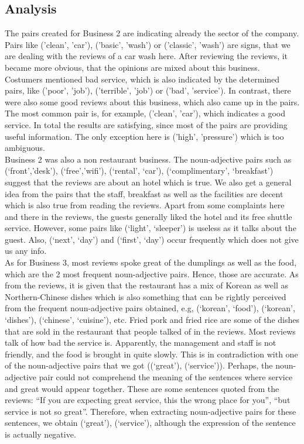 \subsection{Analysis}
The pairs created for Business 2 are indicating already the sector of the company. Pairs like ('clean', 'car'), ('basic', 'wash') or ('classic', 'wash') are signs, that we are dealing with the reviews of a car wash here. After reviewing the reviews, it became more obvious, that the opinions are mixed about this business. Costumers mentioned bad service, which is also indicated by the determined pairs, like ('poor', 'job'), ('terrible', 'job') or ('bad', 'service'). In contrast, there were also some good reviews about this business, which also came up in the pairs. The most common pair is, for example, ('clean', 'car'), which indicates a good service. In total the results are satisfying, since most of the pairs are providing useful information. The only exception here is ('high', 'pressure') which is too ambiguous.\\
Business 2 was also a non restaurant business. The noun-adjective pairs such as (‘front’,’desk’), (‘free’,’wifi’), (‘rental’, ‘car’), (‘complimentary’, ‘breakfast’) suggest that the reviews are about an hotel which is true. We also get a general idea from the pairs that the staff, breakfast as well as the facilities are decent which is also true from reading the reviews. Apart from some complaints here and there in the reviews, the guests generally liked the hotel and its free shuttle service. However, some pairs like (‘light’, ‘sleeper’) is useless as it talks about the guest. Also, (‘next’, ‘day’) and (‘first’, ‘day’) occur frequently which does not give us any info.\\
As for Business 3, most reviews spoke great of the dumplings as well as the food, which are the 2 most frequent noun-adjective pairs. Hence, those are accurate. As from the reviews, it is given that the restaurant has a mix of Korean as well as Northern-Chinese dishes which is also something that can be rightly perceived from the frequent noun-adjective pairs obtained, e.g, (‘korean’, ‘food’), (‘korean’, ‘dishes’), (‘chinese’, ‘cuisine’), etc. Fried pork and fried rice are some of the dishes that are sold in the restaurant that people talked of in the reviews. Most reviews talk of how bad the service is. Apparently, the management and staff is not friendly, and the food is brought in quite slowly. This is in contradiction with one of the noun-adjective pairs that we got ((‘great’), (‘service’)).  Perhaps, the noun-adjective pair could not comprehend the meaning of the sentences where service and great would appear together. These are some sentences quoted from the reviews: “If you are expecting great service, this the wrong place for you”, “but service is not so great”.  Therefore, when extracting noun-adjective pairs for these sentences, we obtain (‘great’), (‘service’), although the expression of the sentence is actually negative.\\
